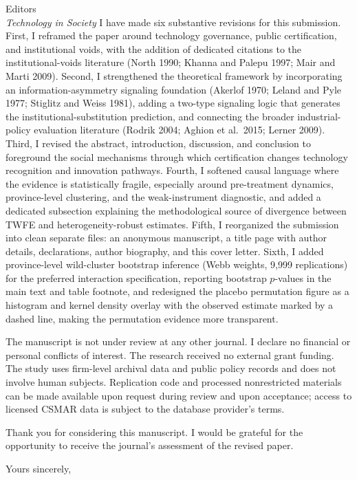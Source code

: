 \documentclass[12pt]{letter}
\begin{document}
\begin{letter}{Editors\\\textit{Technology in Society}}
I have made six substantive revisions for this submission. First, I reframed the paper around technology governance, public certification, and institutional voids, with the addition of dedicated citations to the institutional-voids literature (North 1990; Khanna and Palepu 1997; Mair and Marti 2009). Second, I strengthened the theoretical framework by incorporating an information-asymmetry signaling foundation (Akerlof 1970; Leland and Pyle 1977; Stiglitz and Weiss 1981), adding a two-type signaling logic that generates the institutional-substitution prediction, and connecting the broader industrial-policy evaluation literature (Rodrik 2004; Aghion et al.\ 2015; Lerner 2009). Third, I revised the abstract, introduction, discussion, and conclusion to foreground the social mechanisms through which certification changes technology recognition and innovation pathways. Fourth, I softened causal language where the evidence is statistically fragile, especially around pre-treatment dynamics, province-level clustering, and the weak-instrument diagnostic, and added a dedicated subsection explaining the methodological source of divergence between TWFE and heterogeneity-robust estimates. Fifth, I reorganized the submission into clean separate files: an anonymous manuscript, a title page with author details, declarations, author biography, and this cover letter. Sixth, I added province-level wild-cluster bootstrap inference (Webb weights, 9,999 replications) for the preferred interaction specification, reporting bootstrap $p$-values in the main text and table footnote, and redesigned the placebo permutation figure as a histogram and kernel density overlay with the observed estimate marked by a dashed line, making the permutation evidence more transparent.

The manuscript is not under review at any other journal. I declare no financial or personal conflicts of interest. The research received no external grant funding. The study uses firm-level archival data and public policy records and does not involve human subjects. Replication code and processed nonrestricted materials can be made available upon request during review and upon acceptance; access to licensed CSMAR data is subject to the database provider's terms.

Thank you for considering this manuscript. I would be grateful for the opportunity to receive the journal's assessment of the revised paper.

\closing{Yours sincerely,}

\end{letter}
\end{document}

